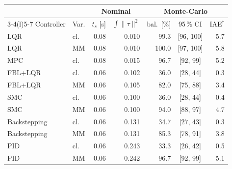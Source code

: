 \setlength{\tabcolsep}{3.0pt}
\begin{tabular}{@{}llrrrcr@{}}
\toprule
& & \multicolumn{2}{c}{Nominal} & \multicolumn{3}{c}{Monte-Carlo} \\
\cmidrule(lr){3-4}\cmidrule(l){5-7}
Controller & Var. & $t_s$ [s] & $\int\|\tau\|^2$ & bal.\ [\%] & 95\,\% CI & IAE$^\dagger$ \\
\midrule
LQR & cl. & 0.08 & 0.010 & 99.3 & [96, 100] & 5.7 \\
LQR & MM & 0.08 & 0.010 & 100.0 & [97, 100] & 5.8 \\
MPC & cl. & 0.08 & 0.015 & 96.7 & [92, 99] & 5.2 \\
FBL+LQR & cl. & 0.06 & 0.102 & 36.0 & [28, 44] & 0.3 \\
FBL+LQR & MM & 0.06 & 0.105 & 82.0 & [75, 88] & 3.4 \\
SMC & cl. & 0.06 & 0.100 & 36.0 & [28, 44] & 0.4 \\
SMC & MM & 0.06 & 0.100 & 94.0 & [88, 97] & 4.7 \\
Backstepping & cl. & 0.06 & 0.131 & 34.7 & [27, 43] & 0.3 \\
Backstepping & MM & 0.06 & 0.131 & 85.3 & [78, 91] & 3.8 \\
PID & cl. & 0.06 & 0.243 & 33.3 & [26, 42] & 0.5 \\
PID & MM & 0.06 & 0.242 & 96.7 & [92, 99] & 5.1 \\
\bottomrule
\end{tabular}